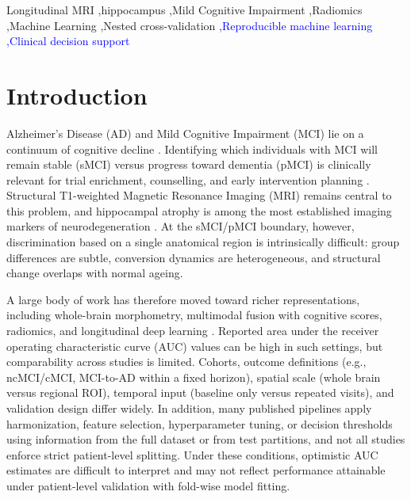 \documentclass[review]{elsarticle}
\newcommand{\corrigir}[2]{%
	\textcolor{red}{\sout{#1}} %
	\textcolor{blue}{#2}%
}
\begin{document}
\begin{frontmatter}
\begin{abstract}
		\end{abstract}
		
		\begin{keyword}
			Longitudinal MRI \sep hippocampus \sep Mild Cognitive Impairment \sep Radiomics \sep Machine Learning \sep Nested cross-validation \corrigir{}{\sep Reproducible machine learning \sep Clinical decision support}
		\end{keyword}
		
	\end{frontmatter}
	
	\section{Introduction}
	\label{sec:Introduction}
	
	Alzheimer's Disease (AD) and Mild Cognitive Impairment (MCI) lie on a continuum of cognitive decline \cite{petersen-1999}. Identifying which individuals with MCI will remain stable (sMCI) versus progress toward dementia (pMCI) is clinically relevant for trial enrichment, counselling, and early intervention planning \cite{petersen-2009}. Structural T1-weighted Magnetic Resonance Imaging (MRI) remains central to this problem, and hippocampal atrophy is among the most established imaging markers of neurodegeneration \cite{scheltens-1992}. At the sMCI/pMCI boundary, however, discrimination based on a single anatomical region is intrinsically difficult: group differences are subtle, conversion dynamics are heterogeneous, and structural change overlaps with normal ageing.
	
	A large body of work has therefore moved toward richer representations, including whole-brain morphometry, multimodal fusion with cognitive scores, radiomics, and longitudinal deep learning \cite{moradi-2015,ye-2012,zhang-2019,lin-2020,aghajanian-2025}. Reported area under the receiver operating characteristic curve (AUC) values can be high in such settings, but comparability across studies is limited. Cohorts, outcome definitions (e.g., ncMCI/cMCI, MCI-to-AD within a fixed horizon), spatial scale (whole brain versus regional ROI), temporal input (baseline only versus repeated visits), and validation design differ widely. In addition, many published pipelines apply harmonization, feature selection, hyperparameter tuning, or decision thresholds using information from the full dataset or from test partitions, and not all studies enforce strict patient-level splitting. Under these conditions, optimistic AUC estimates are difficult to interpret and may not reflect performance attainable under patient-level validation with fold-wise model fitting.
	
\end{document}
